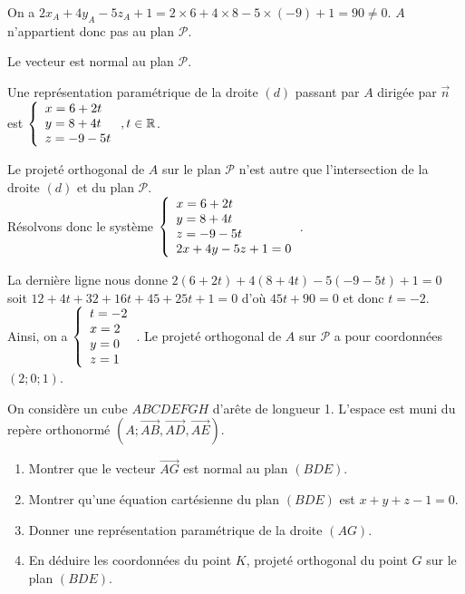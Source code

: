 \documentclass[11pt,fleqn, openany]{book} %
\begin{document}
\begin{solution}On a $2x_A+4y_A-5z_A+1=2 \times 6+4 \times 8-5 \times (-9)+1=90 \neq 0$. $A$ n'appartient donc pas au plan $\mathcal{P}$.

Le vecteur  est normal au plan $\mathcal{P}$.

Une représentation paramétrique de la droite $(d)$ passant par $A$ dirigée par $\vec n$ est $\left\{\renewcommand{\arraystretch}{1}\renewcommand{\arraystretch}{1}\begin{array}{l} x= 6+2t \\ y=8+4t \\z=-9-5t\end{array}\right.,t\in\mathbb{R}$.

Le projeté orthogonal de $A$ sur le plan $\mathcal{P}$ n'est autre que l'intersection de la droite $(d)$ et du plan $\mathcal{P}$. \\ Résolvons donc le système $\left\{\renewcommand{\arraystretch}{1}\renewcommand{\arraystretch}{1}\begin{array}{l} x= 6+2t \\ y=8+4t \\z=-9-5t \\ 2x+4y-5z+1=0\end{array}\right.$.

La dernière ligne nous donne $2(6+2t)+4(8+4t)-5(-9-5t)+1=0$ soit $12+4t+32+16t+45+25t+1=0$ d'où $45t+90=0$ et donc $t=-2$. Ainsi, on a $\left\{\renewcommand{\arraystretch}{1}\renewcommand{\arraystretch}{1}\begin{array}{l} t=-2 \\ x= 2 \\ y=0 \\z=1 \end{array}\right.$. Le projeté orthogonal de $A$ sur $\mathcal{P}$ a pour coordonnées $(2;0;1)$.\end{solution}



\begin{exercise}[topic=geom15]On considère un cube $ABCDEFGH$ d'arête de longueur 1. L'espace est muni du repère orthonormé $(A;\overrightarrow{AB},\overrightarrow{AD},\overrightarrow{AE})$. 

\begin{enumerate}
\item Montrer que le vecteur $\overrightarrow{AG}$ est normal au plan $(BDE)$.
\item Montrer qu'une équation cartésienne du plan $(BDE)$ est $x+y+z-1=0$.
\item Donner une représentation paramétrique de la droite $(AG)$.
\item En déduire les coordonnées du point $K$, projeté orthogonal du point $G$ sur le plan $(BDE)$.
\end{enumerate}\end{exercise}
\end{document}
